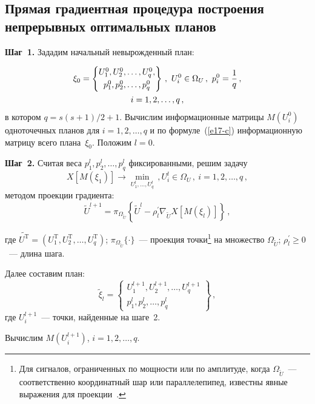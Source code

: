 \begin{multicols}{2}
\subsection{Прямая градиентная процедура построения непрерывных
оптимальных планов}

\smallskip

\textbf{Шаг~1.} Зададим начальный невырожденный план:

\noindent
\begin{multline*}
\xi_0=\left \{
\begin{matrix}
U_1^0, U_2^0, \ldots , U_q^0,\\[3pt]
p_1^0, p_2^0, \ldots , p_q^0
\end{matrix}
\right \}\,,\ U_i^0\in \Omega_U\,,\
p_i^0=\displaystyle\frac{\displaystyle 1\mathstrut}{\displaystyle q\mathstrut}\,,\\ i=1, 2, \ldots ,q\,,
\end{multline*}
в котором $q=s(s+1)/2+1$. Вычислим информационные матрицы $M(U_i^0)$
одноточечных планов для $i=1, 2, \ldots , q$ и по формуле~(\ref{e17-c})
информационную матрицу всего плана~$\xi_0$. Положим $l=0$.

\smallskip

\textbf{Шаг~2.} Считая веса $p_1^l, p_2^l, \ldots , p_q^l$ фиксированными, решим
задачу
$$
X[M(\xi_1)]\rightarrow \min_{U_1^l, \ldots , U_q^l}\,, U_i^l\in \Omega_U\,,\
i=1, 2, \ldots , q\,,
$$
методом проекции градиента:
$$
\tilde{U}^{l+1}=\pi_{\Omega_{\tilde{U}}}\left\{ \tilde{U}^l-\rho_l^\prime
\nabla_{\tilde{U}} X[M(\xi_l)]\right \}\,,
$$


\noindent
где $\tilde{U^{\mathrm{T}}}=(U_1^{\mathrm{T}}, U_2^{\mathrm{T}}, \ldots , U_q^{\mathrm{T}})$;
$\pi_{\Omega_{\tilde{U}}}\{\cdot\}$~--- проекция точ\-ки\footnote{Для сигналов,
ограниченных по мощности или по амплитуде, когда $\Omega_{\tilde{U}}$~---
соответственно координатный шар или параллелепипед, известны явные выражения для
проекции~\cite{18-c}.} на множество $\Omega_{\tilde{U}}$; $\rho_l^\prime \geq
0$~--- длина шага.

  Далее составим план:
  $$
  \tilde{\xi}_l=\left \{
  \begin{matrix}
  U_1^{l+1}, U_2^{l+1}, \ldots , U_q^{l+1}\\[3pt]
  p_1^l, p_2^l, \ldots , p_q^l
  \end{matrix}
  \right \}\,,
  $$
где $U_i^{l+1}$~--- точки, найденные на шаге~2. 

Вычислим $M(U_i^{l+1})$, $i=1, 2, \ldots ,q$.

  \smallskip


\end{multicols}
